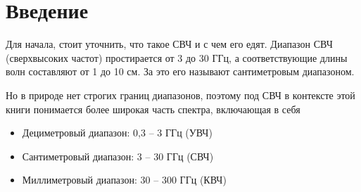 \chapter*{Введение}
Для начала, стоит уточнить, что такое СВЧ и с чем его едят. Диапазон СВЧ
(сверхвысоких частот) простирается от 3 до 30 ГГц, а соответствующие длины волн
составляют от 1 до 10 см. За это его называют сантиметровым диапазоном.

Но в природе нет строгих границ диапазонов, поэтому под СВЧ в контексте этой
книги понимается более широкая часть спектра, включающая в себя
  \begin{itemize}
    \item Дециметровый диапазон: 0,3 -- 3 ГГц (УВЧ)
    \item Сантиметровый диапазон: 3 -- 30 ГГц (СВЧ)
    \item Миллиметровый диапазон: 30 -- 300 ГГц (КВЧ)
  \end{itemize}


